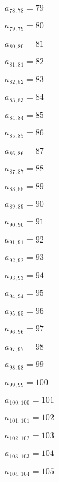 \documentclass[a4paper,12pt]{article}
\begin{document}
$a _{ 78, 78 } = 79$

$a _{ 79, 79 } = 80$

$a _{ 80, 80 } = 81$

$a _{ 81, 81 } = 82$

$a _{ 82, 82 } = 83$

$a _{ 83, 83 } = 84$

$a _{ 84, 84 } = 85$

$a _{ 85, 85 } = 86$

$a _{ 86, 86 } = 87$

$a _{ 87, 87 } = 88$

$a _{ 88, 88 } = 89$

$a _{ 89, 89 } = 90$

$a _{ 90, 90 } = 91$

$a _{ 91, 91 } = 92$

$a _{ 92, 92 } = 93$

$a _{ 93, 93 } = 94$

$a _{ 94, 94 } = 95$

$a _{ 95, 95 } = 96$

$a _{ 96, 96 } = 97$

$a _{ 97, 97 } = 98$

$a _{ 98, 98 } = 99$

$a _{ 99, 99 } = 100$

$a _{ 100, 100 } = 101$

$a _{ 101, 101 } = 102$

$a _{ 102, 102 } = 103$

$a _{ 103, 103 } = 104$

$a _{ 104, 104 } = 105$
\end{document}
